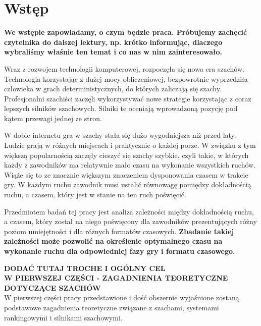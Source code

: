 \documentclass[inzynierska]{pwr_wmat_praca_dyplomowa}
\theoremstyle{plain}
\numberwithin{theorem}{chapter}
\theoremstyle{definition}
\numberwithin{theorem}{chapter}
\begin{document}

\frontmatter
\maketitle
\mainmatter
\tableofcontents

{\backmatter \chapter{Wstęp}}
\textbf{We wstępie zapowiadamy, o czym będzie praca. Próbujemy zachęcić czytelnika do dalszej lektury, np. krótko informując, dlaczego wybraliśmy właśnie ten temat i co nas w nim zainteresowało.}

Wraz z rozwojem technologii komputerowej, rozpoczęła się nowa era szachów. Technologia korzystając z dużej mocy obliczeniowej, bezpowrotnie wyprzedziła człowieka w grach deterministycznych, do których zaliczają się szachy. Profesjonalni szachiści zaczęli wykorzystywać nowe strategie korzystając z coraz lepszych silników szachowych. Silniki te oceniają wprowadzoną pozycję pod kątem przewagi jednej ze stron. 

W dobie internetu gra w szachy stała się dużo wygodniejsza niż przed laty. Ludzie grają w różnych miejscach i praktycznie o każdej porze. W związku z tym większą popularnością zaczęły cieszyć się szachy szybkie, czyli takie, w których każdy z zawodników ma relatywnie mało czasu na wykonanie wszystkich ruchów. Wiąże się to ze znacznie większym znaczeniem dysponowania czasem w trakcie gry. W każdym ruchu zawodnik musi ustalić równowagę pomiędzy dokładnością ruchu, a czasem, który jest w stanie na ten ruch poświęcić. 

Przedmiotem badań tej pracy jest analiza zależności między dokładnością ruchu, a czasem, który został na niego poświęcony dla zawodników prezentujących różny poziom umiejętności i dla różnych formatów czasowych.\textbf{ Zbadanie takiej zależności może pozwolić na określenie optymalnego czasu na wykonanie ruchu dla odpowiedniej fazy gry i formatu czasowego.}

\textbf{DODAĆ TUTAJ TROCHE I OGÓLNY CEL}\\


\textbf{W PIERWSZEJ CZĘŚCI - ZAGADNIENIA TEORETYCZNE DOTYCZĄCE SZACHÓW}\\
W pierwszej części pracy przedstawione i dość obszernie wyjaśnione zostaną podstawowe zagadnienia teoretyczne związane z szachami, systemami rankingowymi i silnikami szachowymi.
\end{document}

